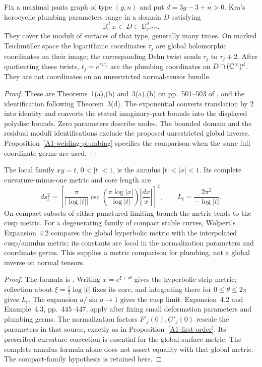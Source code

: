 \begin{proposition}\label{A1-kra-comparison}
Fix a maximal pants graph of type $(g,n)$ and put $d=3g-3+n>0$. Kra's horocyclic plumbing parameters range in a domain $D$ satisfying
\[
 \mathbb D_{e^{-2\pi}}^{d}\subset D
                   \subset\mathbb D_{e^{-\pi/2}}^{d}.
\]
They cover the moduli of surfaces of that type, generally many times. On marked Teichm\"uller space the logarithmic coordinates $\tau_j$ are global holomorphic coordinates on their image; the corresponding Dehn twist sends $\tau_j$ to $\tau_j+2$. After quotienting these twists, $t_j=e^{\pi i\tau_j}$ are the plumbing coordinates on $D\cap({\mathbb{C}}^\times)^d$. They are not coordinates on an unrestricted normal-tensor bundle.
\end{proposition}
\begin{proof}
These are Theorems~1(a),(b) and~3(a),(b) on pp.~501--503 of \cite{AKra1990}, and the identification following Theorem~3(d). The exponential converts translation by $2$ into identity and converts the stated imaginary-part bounds into the displayed polydisc bounds. Zero parameters describe nodes. The bounded domain and the residual moduli identifications exclude the proposed unrestricted global inverse. Proposition~\ref{A1-welding-plumbing} specifies the comparison when the same full coordinate germs are used.
\end{proof}

\begin{proposition}\label{A1-wolpert-comparison}
The local family $xy=t$, $0<|t|<1$, is the annulus $|t|<|x|<1$. Its complete curvature-minus-one metric and core length are
\[
 ds_t^2=\left[
 \frac{\pi}{|\log|t||}
 \csc\!\left(\frac{\pi\log|x|}{\log|t|}\right)
 \left|\frac{dx}{x}\right|\right]^2,
 \qquad L_t=\frac{2\pi^2}{-\log|t|}.
\]
On compact subsets of either punctured limiting branch the metric tends to the cusp metric. For a degenerating family of compact stable curves, Wolpert's Expansion~4.2 compares the global hyperbolic metric with the interpolated cusp/annulus metric; its constants are local in the normalization parameters and coordinate germs. This supplies a metric comparison for plumbing, not a global inverse on normal tensors.
\end{proposition}
\begin{proof}
The formula is \cite[\S0.1, p.~417]{AWolpert1990}. Writing $x=e^{\xi+i\theta}$ gives the hyperbolic strip metric; reflection about $\xi=\tfrac12\log|t|$ fixes its core, and integrating there for $0\le\theta\le2\pi$ gives $L_t$. The expansion $a/\sin a\to1$ gives the cusp limit. Expansion~4.2 and Example~4.3, pp.~445--447, apply after fixing small deformation parameters and plumbing germs. The normalization factors $F'_j(0),G'_j(0)$ rescale the parameters in that source, exactly as in Proposition~\ref{A1-first-order}. Its prescribed-curvature correction is essential for the global surface metric. The complete annulus formula alone does not assert equality with that global metric. The compact-family hypothesis is retained here.
\end{proof}

